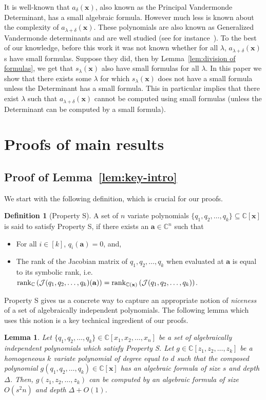 \documentclass[10pt,a4paper]{article}
\newtheorem{lemma}[theorem]{Lemma}
\theoremstyle{definition}
\newtheorem{definition}[theorem]{Definition}
\newcommand{\F}{\mathbb C}
\newcommand{\va}{\mathbf a}
\newcommand{\vx}{\mathbf x}
\DeclareMathOperator{\rank}{rank}
\begin{document}
It is well-known that $a_\delta(\vx)$, also known as the Principal Vandermonde Determinant, has a small algebraic formula. 
However much less is known about the complexity of $a_{\lambda+\delta}(\vx)$. These polynomials are also known as Generalized Vandermonde determinants and are well studied (see for instance~\cite{r18}). %
To the best of our knowledge, before this work it was not known whether for all $\lambda$, $a_{\lambda+\delta}(\vx)$s  have small formulas. Suppose they did, then by Lemma~\ref{lem:division of formulas}, we get that $s_\lambda(\vx)$ also have small formulas for all $\lambda$. 
In this paper we show that there exists some $\lambda$ for which $s_\lambda(\vx)$ does not have a small formula unless the Determinant has a small formula. This in particular implies that there exist $\lambda$ such that  $a_{\lambda+\delta}(\vx)$ cannot be computed using small formulas (unless the Determinant can be computed by a small formula).

%
%
%
%
%

\section{Proofs of main results}
\subsection{Proof of Lemma~\ref{lem:key-intro}}\label{sec:key lemma}
We start with the following definition, which is crucial for our proofs. 
\begin{definition}[Property S]\label{def:prop s}
A set of $n$ variate polynomials $\{q_1, q_2, \ldots, q_k\} \subseteq \F[\vx]$ is said to satisfy Property S, if there exists an $\va \in \F^n$ such that
\begin{itemize}
\item For all $i \in [k]$, $q_i(\va) = 0$, and,
\item The rank of the Jacobian matrix of $q_1, q_2, \ldots, q_k$ when evaluated at $\va$ is equal to its symbolic rank, i.e. ${\rank}_{\F}\left({\cal J}(q_1, q_2, \ldots, q_k)(\va)\right) = \rank_{\F(\vx)}\left({\cal J}(q_1, q_2, \ldots, q_k)\right)$.
\end{itemize} 
\end{definition}
Property S gives us a concrete way to capture an appropriate notion of \emph{niceness} of a set of algebraically independent polynomials. The following lemma which uses this notion is a key technical ingredient of our proofs. 
\begin{lemma}\label{lem:key}
Let $\{q_1, q_2, \ldots, q_k\} \in \F[x_1, x_2, \ldots, x_n]$ be a set of algebraically independent polynomials which satisfy Property S. Let $g \in \F[z_1, z_2, \ldots, z_k]$ be a homogeneous $k$ variate polynomial of degree equal to $d$ such that the composed polynomial $g(q_1, q_2, \ldots, q_k) \in \F[\vx]$ has an algebraic formula of size $s$ and depth $\Delta$. Then, $g(z_1, z_2, \ldots, z_k)$ can be computed by an algebraic formula of size $O(s^2n)$ and depth $\Delta+O(1)$.  
\end{lemma}
\end{document}
